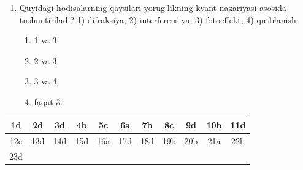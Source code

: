 \begin{enumerate}
\item Quyidagi hodisalarning qaysilari yorug‘likning kvant nazariyasi asosida tushuntiriladi?
1) difraksiya; 2) interferensiya; 3) fotoeffekt; 4) qutblanish.
\begin{enumerate}[label=\Alph*)]
\item 1 va 3.
\item 2 va 3.
\item 3 va 4.
\item faqat 3.
\end{enumerate}

\end{enumerate}



\begin{table}[!ht]
\centering
\begin{tabular}{|c|c|c|c|c|c|c|c|c|c|c|}
\hline
1d & 2d & 3d & 4b & 5c & 6a & 7b & 8c & 9d & 10b & 11d \\ \hline
12c & 13d & 14d & 15d & 16a & 17d & 18d & 19b & 20b & 21a & 22b \\ \hline
23d & & & & & & & & & & \\ \hline
\end{tabular}
\end{table}